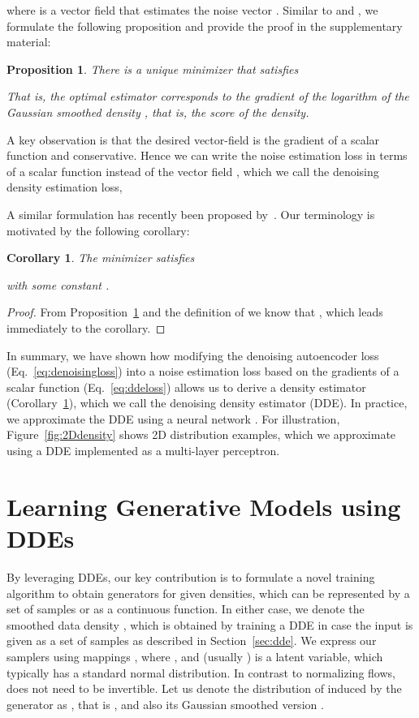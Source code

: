 \documentclass{article}
\newtheorem{proposition}{Proposition}
\newtheorem{corollary}{Corollary}
\begin{document}
where  is a vector field that estimates the noise vector .
Similar to \citet{Vincent:2011:CSM} and \citet{JMLR:v15:alain14a}, we formulate the following proposition and provide the proof in the supplementary material:

\begin{proposition}
There is a unique minimizer  that satisfies

That is, the optimal estimator corresponds to the gradient of the logarithm of the Gaussian smoothed density , that is, the score of the density.
\label{prop:nes}
\end{proposition}

A key observation is that the desired vector-field  is the gradient of a scalar function and conservative. Hence we can write the noise estimation loss in terms of a scalar function  instead of the vector field , which we call the denoising density estimation loss, 

A similar formulation has recently been proposed by~\citet{Saremi2019NeuralEB}. Our terminology is motivated by the following corollary:
\begin{corollary} The minimizer  satisfies

with some constant .
\label{cor:dde}
\end{corollary}
\begin{proof}
From Proposition~\ref{prop:nes} and the definition of  we know that , which leads immediately to the corollary.
\end{proof}
In summary, we have shown how modifying the denoising autoencoder loss (Eq.~\ref{eq:denoisingloss}) into a noise estimation loss based on the gradients of a scalar function (Eq.~\ref{eq:ddeloss}) allows us to derive a density estimator (Corollary~\ref{cor:dde}), which we call the denoising density estimator (DDE). In practice, we approximate the DDE using a neural network .
For illustration, Figure~\ref{fig:2Ddensity} shows 2D distribution examples, which we approximate using a DDE implemented as a multi-layer perceptron.


\section{Learning Generative Models using DDEs}
\label{sec:generativemodels} 

By leveraging DDEs, our key contribution is to formulate a novel training algorithm to obtain generators for given densities, which can be represented by a set of samples or as a continuous function. In either case, we denote the smoothed data density , which is obtained by training a DDE in case the input is given as a set of samples as described in Section~\ref{sec:dde}. We express our samplers using mappings , where , and  (usually ) is a latent variable, which typically has a standard normal distribution. In contrast to normalizing flows,  does not need to be invertible. Let us denote the distribution of  induced by the generator as , that is , and also its Gaussian smoothed version . 
\end{document}
